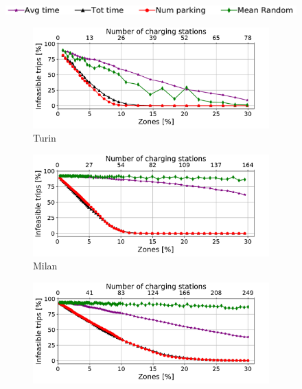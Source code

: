 \begin{figure}[t!]
	\begin{center}
		\includegraphics[width=\textwidth]{figures/legenda2.pdf}
	\end{center}
	\begin{center}
		\begin{subfigure}{0.49\textwidth}
			\includegraphics[width=\columnwidth]{figures/Torino_zonesVsDeaths_algorithms_acs-4_tt-25_policy-FreeFloating.pdf}
			\caption{Turin}
			\label{fig:6_6_zone_vs_deaths_torino}
		\end{subfigure}
		\begin{subfigure}{0.49\textwidth}
			\includegraphics[width=\columnwidth]{figures/Milano_zonesVsDeaths_algorithms_acs-4_tt-25_policy-FreeFloating.pdf}
			\caption{Milan}
			\label{fig:6_6_zone_vs_deaths_milano}
		\end{subfigure}
		\begin{subfigure}{0.49\textwidth}
			\includegraphics[width=\columnwidth]{figures/Berlino_zonesVsDeaths_algorithms_acs-4_tt-25_policy-FreeFloating.pdf}

\end{subfigure}
\end{center}
\end{figure}
